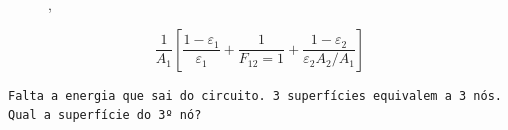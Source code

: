 \documentclass[a4paper, 12pt]{article}
\begin{document}
\begin{figure}[ht]
\caption{\label{fig:6}}
 ,
\end{figure}

\[\frac{1}{A_{1}} \left[  \frac{1-\varepsilon_{1}}{\varepsilon_{1}} + \frac{1}{F_{12}=1  } + \frac{1-\varepsilon _{2}}{\varepsilon _{2} A_{2}/A_{1}} \right]\]

\begin{verbatim}
Falta a energia que sai do circuito. 3 superfícies equivalem a 3 nós. 
Qual a superfície do 3º nó?
\end{verbatim}
\end{document}
